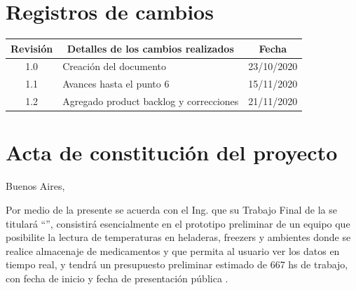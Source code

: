 \documentclass[11pt]{charter}
\begin{document}
\maketitle
\thispagestyle{empty}
\pagebreak


\thispagestyle{empty}
{\setlength{\parskip}{0pt}
\tableofcontents{}
}
\pagebreak


\section{Registros de cambios}
\label{sec:registro}


\begin{table}[ht]
\label{tab:registro}
\centering
\begin{tabularx}{\linewidth}{@{}|c|X|c|@{}}
\hline
\rowcolor[HTML]{C0C0C0} 
Revisión & \multicolumn{1}{c|}{\cellcolor[HTML]{C0C0C0}Detalles de los cambios realizados} & Fecha      \\ \hline
1.0      & Creación del documento                                          & 23/10/2020 \\ \hline
1.1      & Avances hasta el punto 6                                           & 15/11/2020 \\ \hline
1.2      & Agregado product backlog y correcciones                            & 21/11/2020 \\ \hline
\end{tabularx}
\end{table}

\pagebreak



\section{Acta de constitución del proyecto}
\label{sec:acta}

\begin{flushright}
Buenos Aires, \fechaInicioName
\end{flushright}

\vspace{2cm}

Por medio de la presente se acuerda con el Ing. \authorname\hspace{1px} que su Trabajo Final de la \degreename\hspace{1px} se titulará ``\ttitle'', consistirá esencialmente en el prototipo preliminar de un equipo que posibilite la lectura de temperaturas en heladeras, freezers y ambientes donde se realice almacenaje de medicamentos y que permita al usuario ver los datos en tiempo real, y tendrá un presupuesto preliminar estimado de 667 hs de trabajo, con fecha de inicio \fechaInicioName\hspace{1px} y fecha de presentación pública \fechaFinalName.
\end{document}
